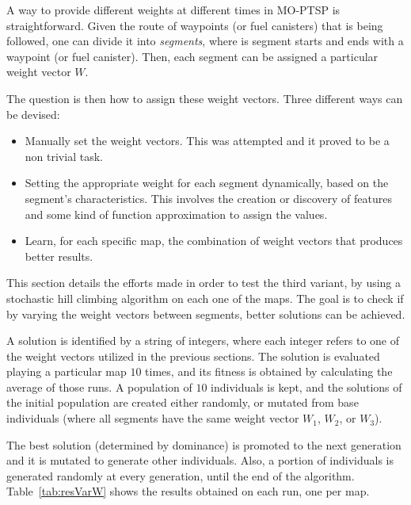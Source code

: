 \documentclass[journal]{IEEEtran}
\begin{document}
A way to provide different weights at different times in MO-PTSP is straightforward. Given the route of waypoints (or fuel canisters) that is being followed, one can divide it into \textit{segments}, where is segment starts and ends with a waypoint (or fuel canister). Then, each segment can be assigned a particular weight vector $W$. 

The question is then how to assign these weight vectors. Three different ways can be devised:

\begin{itemize}
\item Manually set the weight vectors. This was attempted and it proved to be a non trivial task.
\item Setting the appropriate weight for each segment dynamically, based on the segment's characteristics. This involves the creation or discovery of features and some kind of function approximation to assign the values. 
\item Learn, for each specific map, the combination of weight vectors that produces better results.
\end{itemize}

This section details the efforts made in order to test the third variant, by using a stochastic hill climbing algorithm on each one of the maps. The goal is to check if by varying the weight vectors between segments, better solutions can be achieved. 

A solution is identified by a string of integers, where each integer refers to one of the weight vectors utilized in the previous sections. The solution is evaluated playing a particular map $10$ times, and its fitness is obtained by calculating the average of those runs. A population of $10$ individuals is kept, and the solutions of the initial population are created either randomly, or mutated from base individuals (where all segments have the same weight vector $W_1$, $W_2$, or $W_3$). 

The best solution (determined by dominance) is promoted to the next generation and it is mutated to generate other individuals. Also, a portion of individuals is generated randomly at every generation, until the end of the algorithm. Table~\ref{tab:resVarW} shows the results obtained on each run, one per map.
\end{document}
